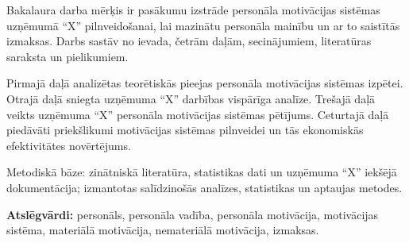 \frontmatterpage
{}
Bakalaura darba mērķis ir pasākumu izstrāde personāla motivācijas sistēmas uzņēmumā “X” pilnveidošanai, lai mazinātu personāla mainību un ar to saistītās izmaksas. Darbs sastāv no ievada, četrām daļām, secinājumiem, literatūras saraksta un pielikumiem.

Pirmajā daļā analizētas teorētiskās pieejas personāla motivācijas sistēmas izpētei.
Otrajā daļā sniegta uzņēmuma “X” darbības vispārīga analīze.
Trešajā daļā veikts uzņēmuma “X” personāla motivācijas sistēmas pētījums.
Ceturtajā daļā piedāvāti priekšlikumi motivācijas sistēmas pilnveidei un tās ekonomiskās efektivitātes novērtējums.

Metodiskā bāze: zinātniskā literatūra, statistikas dati un uzņēmuma “X” iekšējā dokumentācija; izmantotas salīdzinošās analīzes, statistikas un aptaujas metodes.

\textbf{Atslēgvārdi:} personāls, personāla vadība, personāla motivācija, motivācijas sistēma, materiālā motivācija, nemateriālā motivācija, izmaksas.
